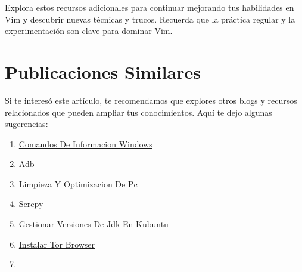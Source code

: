\documentclass[
  doc,
  floatsintext,
  longtable,
  a4paper,
  nolmodern,
  notxfonts,
  notimes,
  12pt,
  colorlinks=true,linkcolor=blue,citecolor=blue,urlcolor=blue]{apa7}
\providecommand{\tightlist}{%
  \setlength{\itemsep}{0pt}\setlength{\parskip}{0pt}}
\begin{document}
Explora estos recursos adicionales para continuar mejorando tus
habilidades en Vim y descubrir nuevas técnicas y trucos. Recuerda que la
práctica regular y la experimentación son clave para dominar Vim.

\section{Publicaciones Similares}\label{publicaciones-similares}

Si te interesó este artículo, te recomendamos que explores otros blogs y
recursos relacionados que pueden ampliar tus conocimientos. Aquí te dejo
algunas sugerencias:

\begin{enumerate}
\def\labelenumi{\arabic{enumi}.}
\tightlist
\item
  \href{https://chaska-x.netlify.app/operating-system/2017-05-21-comandos-de-informacion-windows/index.pdf}{}
  \href{https://chaska-x.netlify.app/operating-system/2017-05-21-comandos-de-informacion-windows}{Comandos
  De Informacion Windows}
\item
  \href{https://chaska-x.netlify.app/operating-system/2019-06-19-adb/index.pdf}{}
  \href{https://chaska-x.netlify.app/operating-system/2019-06-19-adb}{Adb}
\item
  \href{https://chaska-x.netlify.app/operating-system/2021-08-17-limpieza-y-optimizacion-de-pc/index.pdf}{}
  \href{https://chaska-x.netlify.app/operating-system/2021-08-17-limpieza-y-optimizacion-de-pc}{Limpieza
  Y Optimizacion De Pc}
\item
  \href{https://chaska-x.netlify.app/operating-system/2021-10-21-scrcpy/index.pdf}{}
  \href{https://chaska-x.netlify.app/operating-system/2021-10-21-scrcpy}{Scrcpy}
\item
  \href{https://chaska-x.netlify.app/operating-system/2022-05-12-gestionar-versiones-de-jdk-en-kubuntu/index.pdf}{}
  \href{https://chaska-x.netlify.app/operating-system/2022-05-12-gestionar-versiones-de-jdk-en-kubuntu}{Gestionar
  Versiones De Jdk En Kubuntu}
\item
  \href{https://chaska-x.netlify.app/operating-system/2022-07-21-instalar-tor-browser/index.pdf}{}
  \href{https://chaska-x.netlify.app/operating-system/2022-07-21-instalar-tor-browser}{Instalar
  Tor Browser}
\item
  \href{https://chaska-x.netlify.app/operating-system/2022-08-14-crear-enlaces-duros-o-hard-link-en-linux/index.pdf}{}

\end{enumerate}
\end{document}
